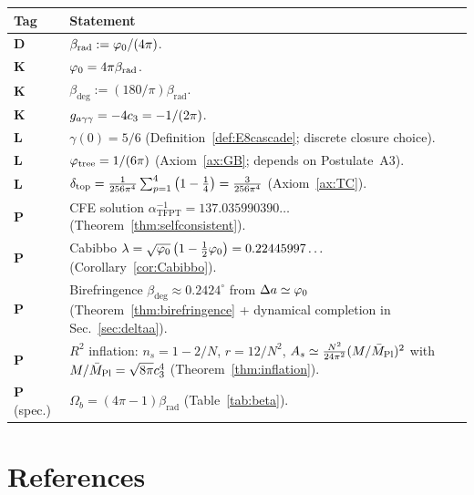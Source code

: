 \begin{center}
\renewcommand{\arraystretch}{1.2}
\begin{tabular}{@{}lp{12cm}@{}}
\toprule
\textbf{Tag} & \textbf{Statement}\\
\midrule
\textbf{D} & $\beta_{\text{rad}} := \varphi_0/(4\pi)$.\\
\textbf{K} & $\varphi_0 = 4\pi\beta_{\text{rad}}$.\\
\textbf{K} & $\beta_{\text{deg}} := (180/\pi)\beta_{\text{rad}}$.\\
\textbf{K} & $g_{a\gamma\gamma} = -4c_3 = -1/(2\pi)$.\\
\textbf{L} & $\gamma(0)=5/6$ (Definition~\ref{def:E8cascade}; discrete closure choice).\\
\textbf{L} & $\varphi_{\mathrm{tree}} = 1/(6\pi)$ (Axiom~\ref{ax:GB}; depends on Postulate~A3).\\
\textbf{L} & $\delta_{\mathrm{top}} = \frac{1}{256\pi^4}\sum_{p=1}^{4}\left(1-\frac{1}{4}\right)=\frac{3}{256\pi^4}$ (Axiom~\ref{ax:TC}).\\
\textbf{P} & CFE solution $\alpha^{-1}_{\text{TFPT}} = 137.035990390\ldots$ (Theorem~\ref{thm:selfconsistent}).\\
\textbf{P} & Cabibbo $\lambda = \sqrt{\varphi_0}\left(1-\frac{1}{2}\varphi_0\right)=0.22445997\ldots$ (Corollary~\ref{cor:Cabibbo}).\\
\textbf{P} & Birefringence $\beta_{\text{deg}} \approx 0.2424^\circ$ from $\Delta a \simeq \varphi_0$ (Theorem~\ref{thm:birefringence} + dynamical completion in Sec.~\ref{sec:deltaa}).\\
\textbf{P} & $R^2$ inflation: $n_s=1-2/N$, $r=12/N^2$, $A_s \simeq \frac{N^2}{24\pi^2}(M/\bar{M}_{\mathrm{Pl}})^2$ with $M/\bar{M}_{\mathrm{Pl}}=\sqrt{8\pi}c_3^4$ (Theorem~\ref{thm:inflation}).\\
\textbf{P} (spec.) & $\Omega_b = (4\pi-1)\beta_{\text{rad}}$ (Table~\ref{tab:beta}).\\
\bottomrule
\end{tabular}
\end{center}

\section*{References}

